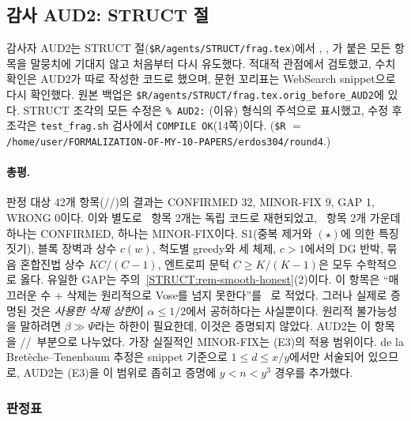 \subsection{감사 AUD2: STRUCT 절}
\label{AUD2:sec}

감사자 AUD2는 STRUCT 절(\texttt{\$R/agents/STRUCT/frag.tex})에서 \PROVED, \REFUTED, 가 붙은 모든 항목을 말뭉치에 기대지 않고 처음부터 다시 유도했다. 적대적 관점에서 검토했고, 수치 확인은 AUD2가 따로 작성한 코드로 했으며, 문헌 꼬리표는 WebSearch snippet으로 다시 확인했다.
원본 백업은 \texttt{\$R/agents/STRUCT/frag.tex.orig\_before\_AUD2}에 있다. STRUCT 조각의 모든 수정은 \texttt{\% AUD2:} (이유) 형식의 주석으로 표시했고, 수정 후 조각은 \texttt{test\_frag.sh} 검사에서 \texttt{COMPILE OK}(14쪽)이다.
(\texttt{\$R} $=$ \texttt{/home/user/FORMALIZATION-OF-MY-10-PAPERS/erdos304/round4}.)

\paragraph{총평.}
판정 대상 42개 항목(\PROVED/\REFUTED/)의 결과는 CONFIRMED 32, MINOR-FIX 9, GAP 1, WRONG 0이다.
이와 별도로 \NUMERIC\ 항목 2개는 독립 코드로 재현되었고, \EXT\ 항목 2개 가운데 하나는 CONFIRMED, 하나는 MINOR-FIX이다.
S1(중복 제거와 $(\star)$에 의한 특징짓기), 블록 장벽과 상수 $c(w)$, 척도별 greedy와 세 체제, $c>1$에서의 DG 반박, 묶음 혼합진법 상수 $KC/(C-1)$, 엔트로피 문턱 $C\ge K/(K-1)$은 모두 수학적으로 옳다.
유일한 GAP는 주의~\ref{STRUCT:rem-smooth-honest}(2)이다. 이 항목은 ``매끄러운 수 $+$ 삭제는 원리적으로 Vose를 넘지 못한다''를 \PROVED\ 로 적었다. 그러나 실제로 증명된 것은 \emph{사용한 삭제 상한}이 $\alpha\le1/2$에서 공허하다는 사실뿐이다. 원리적 불가능성을 말하려면 $\beta\gg\Psi$라는 하한이 필요한데, 이것은 증명되지 않았다. AUD2는 이 항목을 \PROVED/\EXT/\HEUR\ 부분으로 나누었다.
가장 실질적인 MINOR-FIX는 (E3)의 적용 범위이다. de la Bretèche--Tenenbaum 추정은 snippet 기준으로 $1\le d\le x/y$에서만 서술되어 있으므로, AUD2는 (E3)을 이 범위로 좁히고 증명에 $y<n<y^3$ 경우를 추가했다.

\subsubsection{판정표}
\label{AUD2:table}

